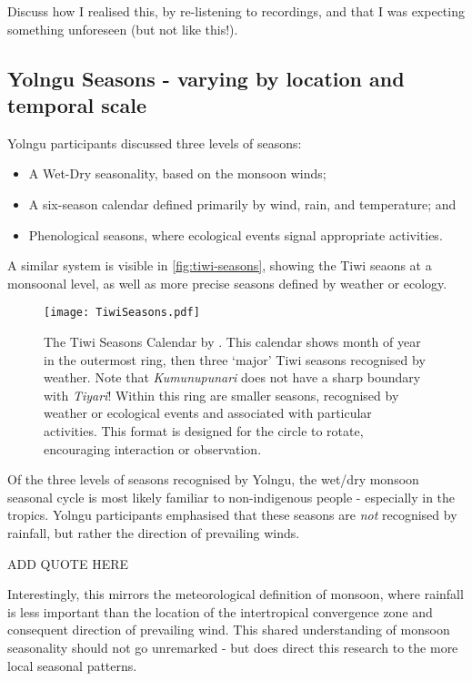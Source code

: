 Discuss how I realised this, by re-listening to recordings, and that I was expecting something unforeseen (but not like this!).  



\subsection{Yolngu Seasons - varying by location and temporal scale}

Yolngu participants discussed three levels of seasons:
\begin{itemize}
\item A Wet-Dry seasonality, based on the monsoon winds;
\item A six-season calendar defined primarily by wind, rain, and temperature; and
\item Phenological seasons, where ecological events signal appropriate activities.
\end{itemize}

A similar system is visible in \autoref{fig:tiwi-seasons}, showing the Tiwi seaons at
a monsoonal level, as well as more precise seasons defined by weather or ecology.


\begin{landscape}
\begin{figure}[p]
    \centering
    \texttt{[image: TiwiSeasons.pdf]}
    \caption[The Tiwi Seasons Calendar by \citet{CSIROcals}]{
        The Tiwi Seasons Calendar by \citet{CSIROcals}.
        This calendar shows month of year in the outermost ring,
        then three `major' Tiwi seasons recognised by weather.
        Note that \textit{Kumunupunari} does not have a sharp boundary with \textit{Tiyari}!
        Within this ring are smaller seasons, recognised by weather
        or ecological events and associated with particular activities.
        This format is designed for the circle to rotate, encouraging interaction or observation.
        }
    \label{fig:tiwi-seasons}
\end{figure}
\end{landscape}


Of the three levels of seasons recognised by Yolngu,
the wet/dry monsoon seasonal cycle is most likely familiar to non-indigenous people -
especially in the tropics.  Yolngu participants emphasised that these seasons
are \emph{not} recognised by rainfall, but rather the direction of prevailing winds.

ADD QUOTE HERE

Interestingly, this mirrors the meteorological definition of monsoon, where rainfall is less important than
the location of the intertropical convergence zone and consequent direction of prevailing wind.
This shared understanding of monsoon seasonality should not go unremarked -
but does direct this research to the more local seasonal patterns.


